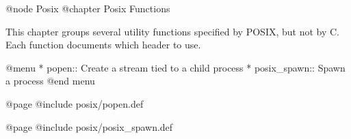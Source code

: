 @node Posix
@chapter Posix Functions

This chapter groups several utility functions specified by POSIX, but
not by C.  Each function documents which header to use.

@menu
* popen::       Create a stream tied to a child process
* posix_spawn:: Spawn a process
@end menu

@page
@include posix/popen.def

@page
@include posix/posix_spawn.def
